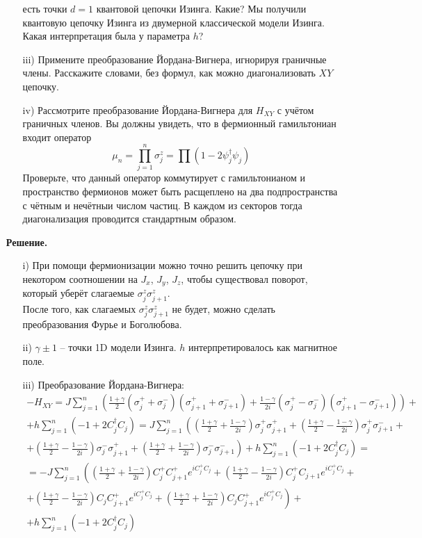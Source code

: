 \documentclass[12pt]{article}
\theoremstyle{definition}
\begin{document}
\begin{enumerate}
\begin{itemize}
        есть точки $d=1$ квантовой цепочки Изинга. Какие? Мы получили квантовую цепочку Изинга из двумерной классической модели Изинга. Какая интерпретация была у параметра $h$?
        \item[iii)] Примените преобразование Йордана-Вигнера, игнорируя граничные члены. Расскажите словами, без формул, как можно диагонализовать $XY$ цепочку.
        \item[iv)] Рассмотрите преобразование Йордана-Вигнера для $H_{XY}$ с учётом граничных членов. Вы должны увидеть, что в фермионный гамильтониан входит оператор
        \begin{equation}
            \mu_n=\prod\limits_{j=1}^n\sigma_j^z=\prod(1-2\psi^\dagger_j\psi_j)
        \end{equation}
        Проверьте, что данный оператор коммутирует с гамильтонианом и пространство фермионов может быть расщеплено на два подпространства с чётным и нечётныи числом частиц. В каждом из секторов тогда диагонализация проводится стандартным образом.
    \end{itemize}
    \textbf{Решение.}
    \begin{itemize}
        \item[i)] При помощи фермионизации можно точно решить цепочку при некотором соотношении на $J_x$, $J_y$, $J_z$, чтобы существовал поворот, который уберёт слагаемые $\sigma^z_j\sigma^z_{j+1}$.\\
        После того, как слагаемых $\sigma^z_j\sigma^z_{j+1}$ не будет, можно сделать преобразования Фурье и Боголюбова.
        \item[ii)] $\gamma\pm 1$ -- точки 1D модели Изинга. $h$ интерпретировалось как магнитное поле.
        \item[iii)] Преобразование Йордана-Вигнера:
        \begin{multline}
            -H_{XY}=J\sum\limits_{j=1}^n\left(\frac{1+\gamma}{2}(\sigma^+_j+\sigma^-_j)(\sigma^+_{j+1}+\sigma^-_{j+1})+\frac{1-\gamma}{2i}(\sigma^+_j-\sigma^-_j)(\sigma^+_{j+1}-\sigma^-_{j+1})\right)+\\+h\sum\limits_{j=1}^n(-1+2C^\dagger_jC_j)=J\sum\limits_{j=1}^n\left(\left(\frac{1+\gamma}{2}+\frac{1-\gamma}{2i}\right)\sigma^+_j\sigma^+_{j+1}+\left(\frac{1+\gamma}{2}-\frac{1-\gamma}{2i}\right)\sigma^+_j\sigma^-_{j+1}+\right.\\\left.+\left(\frac{1+\gamma}{2}-\frac{1-\gamma}{2i}\right)\sigma^-_j\sigma^+_{j+1}+\left(\frac{1+\gamma}{2}+\frac{1-\gamma}{2i}\right)\sigma^-_j\sigma^-_{j+1}\right)+h\sum\limits_{j=1}^n(-1+2C^\dagger_jC_j)=\\=-J\sum\limits_{j=1}^n\left(\left(\frac{1+\gamma}{2}+\frac{1-\gamma}{2i}\right)C_j^+C_{j+1}^+e^{iC^+_jC_j}+\left(\frac{1+\gamma}{2}-\frac{1-\gamma}{2i}\right)C_j^+C_{j+1}e^{iC^+_jC_j}\right.+\\+\left.\left(\frac{1+\gamma}{2}-\frac{1-\gamma}{2i}\right)C_jC^+_{j+1}e^{iC^+_jC_j}+\left(\frac{1+\gamma}{2}+\frac{1-\gamma}{2i}\right)C_jC^+_{j+1}e^{iC^+_jC_j}\right)+\\+h\sum\limits_{j=1}^n(-1+2C^\dagger_jC_j)

\end{multline}
\end{itemize}
\end{enumerate}
\end{document}
